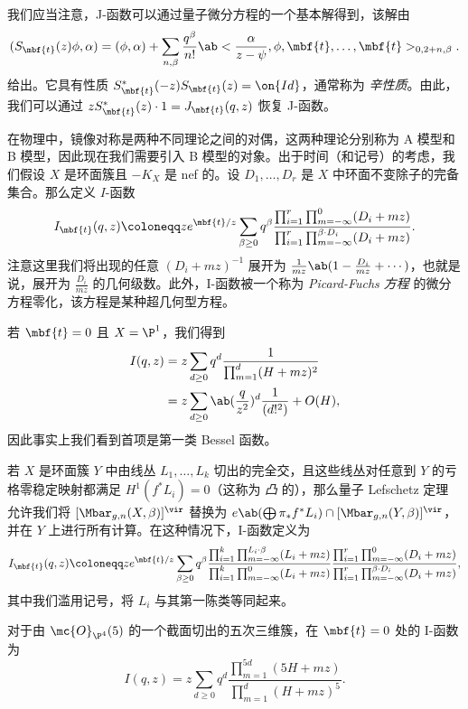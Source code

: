我们应当注意，J-函数可以通过量子微分方程的一个基本解得到，该解由
\[ ( S_{\mbf{t}}(z) \phi , \alpha) = (\phi, \alpha) + \sum_{n, \beta} \frac{q^{\beta}}{n!} \ab<\frac{\alpha}{z-\psi}, \phi, \mbf{t}, \ldots, \mbf{t}>_{0, 2+n, \beta}. \]
给出。它具有性质 \(S_{\mbf{t}}^*(-z) S_{\mbf{t}}(z) = \on{Id}\)，通常称为 \textit{辛性质}。由此，我们可以通过 \(z S_{\mbf{t}}^*(z)\cdot 1 = J_{\mbf{t}}(q, z)\) 恢复 J-函数。

在物理中，镜像对称是两种不同理论之间的对偶，这两种理论分别称为 A 模型和 B 模型，因此现在我们需要引入 B 模型的对象。出于时间（和记号）的考虑，我们假设 \(X\) 是环面簇且 \(-K_X\) 是 nef 的。设 \(D_1, \ldots, D_r\) 是 \(X\) 中环面不变除子的完备集合。那么定义 \(I\)-函数
\[
    I_{\mbf{t}}(q, z) \coloneqq z e^{\mbf{t}/z} \sum_{\beta \geq 0} q^{\beta} \frac{\prod_{i=1}^r \prod_{m = -\infty}^{0} (D_i + mz)}{\prod_{i=1}^r \prod_{m=-\infty}^{\beta \cdot D_i} (D_i + mz)}.
\]
注意这里我们将出现的任意 \((D_i + mz)^{-1}\) 展开为 \(\frac{1}{mz} \ab(1 - \frac{D_i}{mz} + \cdots)\)，也就是说，展开为 \(\frac{D_i}{mz}\) 的几何级数。此外，I-函数被一个称为 \textit{Picard-Fuchs 方程} 的微分方程零化，该方程是某种超几何型方程。

\begin{exm}
    若 \(\mbf{t} = 0\) 且 \(X = \P^1\)，我们得到
    \begin{align*}
        I(q,z) &= z\sum_{d \geq 0} q^d \frac{1}{\prod_{m=1}^d (H + mz)^2} \\
        &= z\sum_{d \geq 0} \ab(\frac{q}{z^2})^d \frac{1}{(d!^2)} + O(H),
    \end{align*}
    因此事实上我们看到首项是第一类 Bessel 函数。
\end{exm}

若 \(X\) 是环面簇 \(Y\) 中由线丛 \(L_1, \ldots, L_k\) 切出的完全交，且这些线丛对任意到 \(Y\) 的亏格零稳定映射都满足 \(H^1(f^* L_i) = 0\)（这称为 \textit{凸} 的），那么量子 Lefschetz 定理~\cite{CoatesGivental2007} 允许我们将 \([\Mbar_{g,n}(X, \beta)]^{\vir}\) 替换为 \(e\ab(\bigoplus \pi_* f^* L_i) \cap [\Mbar_{g,n}(Y, \beta)]^{\vir}\)，并在 \(Y\) 上进行所有计算。在这种情况下，I-函数定义为
\[
    I_{\mbf{t}}(q,z) \coloneqq z e^{\mbf{t}/z} \sum_{\beta \geq 0} q^{\beta} \frac{\prod_{i=1}^k \prod_{m=-\infty}^{L_i \cdot \beta} (L_i + mz)}{\prod_{i=1}^k \prod_{m=-\infty}^{0} (L_i + mz)} \frac{\prod_{i=1}^r \prod_{m = -\infty}^{0} (D_i + mz)}{\prod_{i=1}^r \prod_{m=-\infty}^{\beta \cdot D_i} (D_i + mz)},
\]
其中我们滥用记号，将 \(L_i\) 与其第一陈类等同起来。

\begin{exm}
    对于由 \(\mc{O}_{\P^4}(5)\) 的一个截面切出的五次三维簇，在 \(\mbf{t} = 0\) 处的 I-函数为
    \[ I(q,z) = z \sum_{d \geq 0} q^d \frac{\prod_{m=1}^{5d}(5H+mz)}{\prod_{m=1}^d (H+mz)^5}. \]
\end{exm}

